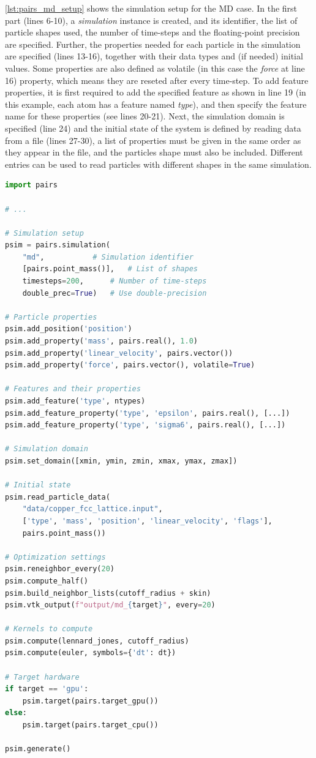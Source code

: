 \documentclass[preprint,12pt]{elsarticle}
\begin{document}
\autoref{lst:pairs_md_setup} shows the simulation setup for the \ac{MD} case. In the first part (lines 6-10), a \emph{simulation} instance is created, and its identifier, the list of particle shapes used, the number of time-steps and the floating-point precision are specified.
Further, the properties needed for each particle in the simulation are specified (lines 13-16), together with their data types and (if needed) initial values.
Some properties are also defined as volatile (in this case the \emph{force} at line 16) property, which means they are reseted after every time-step.
To add feature properties, it is first required to add the specified feature as shown in line 19 (in this example, each atom has a feature named \emph{type}), and then specify the feature name for these properties (see lines 20-21).
Next, the simulation domain is specified (line 24) and the initial state of the system is defined by reading data from a file (lines 27-30), a list of properties must be given in the same order as they appear in the file, and the particles shape must also be included.
Different entries can be used to read particles with different shapes in the same simulation.

\begin{lstlisting}[language=Python,
		   label={lst:pairs_md_setup},
		   caption={Simple example for MD simulation setup in P4IRS.}]
import pairs

# ...

# Simulation setup
psim = pairs.simulation(
	"md", 			# Simulation identifier
	[pairs.point_mass()], 	# List of shapes
	timesteps=200,		# Number of time-steps
	double_prec=True)	# Use double-precision

# Particle properties
psim.add_position('position')
psim.add_property('mass', pairs.real(), 1.0)
psim.add_property('linear_velocity', pairs.vector())
psim.add_property('force', pairs.vector(), volatile=True)

# Features and their properties
psim.add_feature('type', ntypes)
psim.add_feature_property('type', 'epsilon', pairs.real(), [...])
psim.add_feature_property('type', 'sigma6', pairs.real(), [...])

# Simulation domain
psim.set_domain([xmin, ymin, zmin, xmax, ymax, zmax])

# Initial state
psim.read_particle_data(
	"data/copper_fcc_lattice.input",
	['type', 'mass', 'position', 'linear_velocity', 'flags'],
	pairs.point_mass())

# Optimization settings
psim.reneighbor_every(20)
psim.compute_half()
psim.build_neighbor_lists(cutoff_radius + skin)
psim.vtk_output(f"output/md_{target}", every=20)

# Kernels to compute
psim.compute(lennard_jones, cutoff_radius)
psim.compute(euler, symbols={'dt': dt})

# Target hardware
if target == 'gpu':
    psim.target(pairs.target_gpu())
else:
    psim.target(pairs.target_cpu())

psim.generate()
\end{lstlisting}
\end{document}
